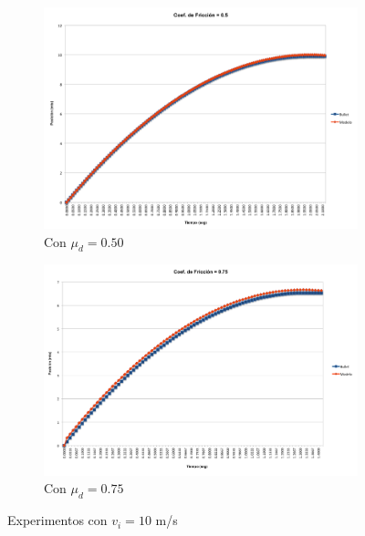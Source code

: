 \documentclass{article}
\begin{document}
\begin{itemize}
\begin{figure}[ht]
  \begin{subfigure}[b]{0.5\linewidth}
    \centering
    \includegraphics[width=0.75\linewidth]{image003.png} 
    \caption{Con $\mu_d=0.50$} 
    \label{fig1:b} 
    \vspace{4ex}
  \end{subfigure} 
  \begin{subfigure}[b]{\linewidth}
    \centering
    \includegraphics[width=0.4\linewidth]{image001.png} 
    \caption{Con $\mu_d=0.75$} 
    \label{fig1:c} 
  \end{subfigure}%
  \caption{Experimentos con $v_i = 10$ m/s}
  \label{fig1} 
  \vspace*{4ex}
\end{figure}


\end{itemize}
\end{document}
